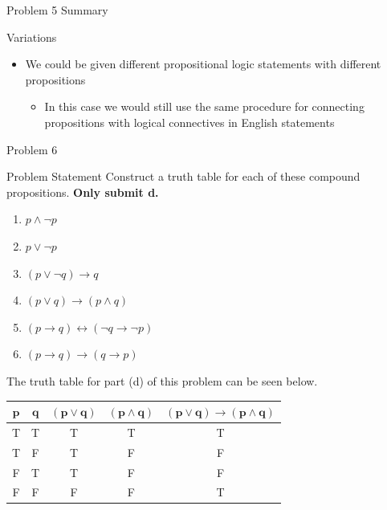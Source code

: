 \begin{summary}{Problem 5 Summary}
\begin{statement}{Variations}
\begin{itemize}
\begin{itemize}
            \end{itemize}
            \item We could be given different propositional logic statements with different propositions
            \begin{itemize}
                \item In this case we would still use the same procedure for connecting propositions with logical connectives in English statements
            \end{itemize}
        \end{itemize}
    \end{statement}
\end{summary}

\begin{problem}{Problem 6}
    \begin{statement}{Problem Statement}
        Construct a truth table for each of these compound propositions. \textbf{Only submit d.}

        \begin{enumerate}[label=(\alph*)]
            \item $p \wedge \neg p$
            \item $p \vee \neg p$
            \item $(p \vee \neg q) \rightarrow q$
            \item $(p \vee q) \rightarrow (p \wedge q)$
            \item $(p \rightarrow q) \leftrightarrow (\neg q \rightarrow \neg p)$
            \item $(p \rightarrow q) \rightarrow (q \rightarrow p)$
        \end{enumerate}
    \end{statement}

    \begin{highlight}
        The truth table for part (d) of this problem can be seen below.

        \begin{center}
            \begin{tabular}[h]{|c|c|c|c|c|}
                \hline $\mathbf{p}$ & $\mathbf{q}$ & $\mathbf{(p \vee q)}$ & $\mathbf{(p \wedge q)}$ & $\mathbf{(p \vee q)} \rightarrow \mathbf{(p \wedge q)}$ \\ \hline
                T & T & T & T & T \\ \hline
                T & F & T & F & F \\ \hline
                F & T & T & F & F \\ \hline
                F & F & F & F & T \\ \hline
            \end{tabular}
        \end{center}
    \end{highlight}
\end{problem}


